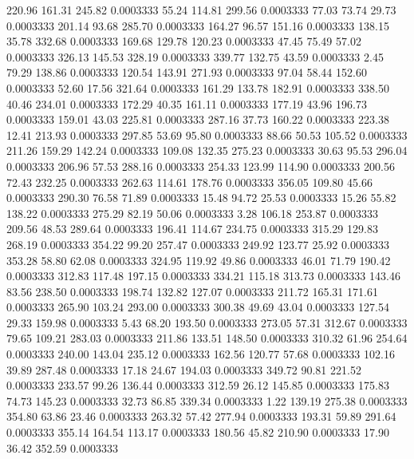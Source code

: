  220.96  161.31  245.82   0.0003333
  55.24  114.81  299.56   0.0003333
  77.03   73.74   29.73   0.0003333
 201.14   93.68  285.70   0.0003333
 164.27   96.57  151.16   0.0003333
 138.15   35.78  332.68   0.0003333
 169.68  129.78  120.23   0.0003333
  47.45   75.49   57.02   0.0003333
 326.13  145.53  328.19   0.0003333
 339.77  132.75   43.59   0.0003333
   2.45   79.29  138.86   0.0003333
 120.54  143.91  271.93   0.0003333
  97.04   58.44  152.60   0.0003333
  52.60   17.56  321.64   0.0003333
 161.29  133.78  182.91   0.0003333
 338.50   40.46  234.01   0.0003333
 172.29   40.35  161.11   0.0003333
 177.19   43.96  196.73   0.0003333
 159.01   43.03  225.81   0.0003333
 287.16   37.73  160.22   0.0003333
 223.38   12.41  213.93   0.0003333
 297.85   53.69   95.80   0.0003333
  88.66   50.53  105.52   0.0003333
 211.26  159.29  142.24   0.0003333
 109.08  132.35  275.23   0.0003333
  30.63   95.53  296.04   0.0003333
 206.96   57.53  288.16   0.0003333
 254.33  123.99  114.90   0.0003333
 200.56   72.43  232.25   0.0003333
 262.63  114.61  178.76   0.0003333
 356.05  109.80   45.66   0.0003333
 290.30   76.58   71.89   0.0003333
  15.48   94.72   25.53   0.0003333
  15.26   55.82  138.22   0.0003333
 275.29   82.19   50.06   0.0003333
   3.28  106.18  253.87   0.0003333
 209.56   48.53  289.64   0.0003333
 196.41  114.67  234.75   0.0003333
 315.29  129.83  268.19   0.0003333
 354.22   99.20  257.47   0.0003333
 249.92  123.77   25.92   0.0003333
 353.28   58.80   62.08   0.0003333
 324.95  119.92   49.86   0.0003333
  46.01   71.79  190.42   0.0003333
 312.83  117.48  197.15   0.0003333
 334.21  115.18  313.73   0.0003333
 143.46   83.56  238.50   0.0003333
 198.74  132.82  127.07   0.0003333
 211.72  165.31  171.61   0.0003333
 265.90  103.24  293.00   0.0003333
 300.38   49.69   43.04   0.0003333
 127.54   29.33  159.98   0.0003333
   5.43   68.20  193.50   0.0003333
 273.05   57.31  312.67   0.0003333
  79.65  109.21  283.03   0.0003333
 211.86  133.51  148.50   0.0003333
 310.32   61.96  254.64   0.0003333
 240.00  143.04  235.12   0.0003333
 162.56  120.77   57.68   0.0003333
 102.16   39.89  287.48   0.0003333
  17.18   24.67  194.03   0.0003333
 349.72   90.81  221.52   0.0003333
 233.57   99.26  136.44   0.0003333
 312.59   26.12  145.85   0.0003333
 175.83   74.73  145.23   0.0003333
  32.73   86.85  339.34   0.0003333
   1.22  139.19  275.38   0.0003333
 354.80   63.86   23.46   0.0003333
 263.32   57.42  277.94   0.0003333
 193.31   59.89  291.64   0.0003333
 355.14  164.54  113.17   0.0003333
 180.56   45.82  210.90   0.0003333
  17.90   36.42  352.59   0.0003333
